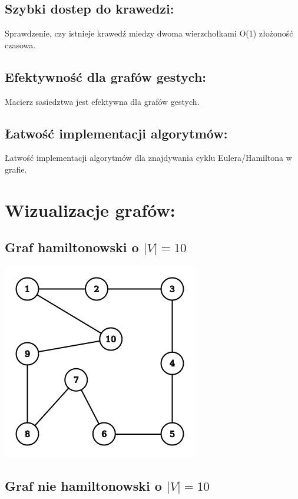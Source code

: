 \documentclass[12pt]{article}
\begin{document}
    \subsection{Szybki dostep do krawedzi:}
        Sprawdzenie, czy istnieje krawedź miedzy dwoma wierzchołkami O(1) złożoność czasowa.

    \subsection{Efektywność dla grafów gestych:}
        Macierz sasiedztwa jest efektywna dla grafów gestych.
    \subsection{Łatwość implementacji algorytmów: }
    		Łatwość implementacji algorytmów dla znajdywania cyklu Eulera/Hamiltona w grafie.
        
\section{Wizualizacje grafów: }

\subsection{Graf hamiltonowski o $|V| = 10$}

\begin{center}

\includegraphics[scale=0.5]{graph_hamilton.png}

\end{center}

\subsection{Graf nie hamiltonowski o $|V| = 10$}
\end{document}
